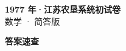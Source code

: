 \documentclass[zihao=-4, a4paper]{ctexart}
\begin{document}
\begin{center}
  {\Large\bfseries 1977 年·江苏农垦系统初试卷}\\[4pt]
  {\large 数学 · 简答版}
\end{center}
\medskip
{}

\clearpage
{}
\begin{center}{\Large\bfseries 答案速查}\end{center}
\medskip

\end{document}

